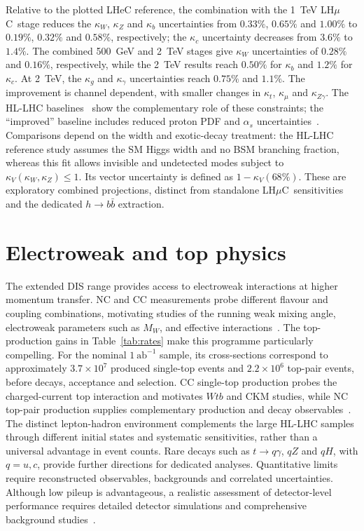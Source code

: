 \documentclass[a4paper,11pt]{article}
\newcommand{\lhmuc}{LH$\mu$C}
\begin{document}
Relative to the plotted LHeC reference, the combination with 
the 1~TeV \lhmuc\ stage reduces the $\kappa_W$, $\kappa_Z$ and $\kappa_b$ uncertainties 
from $0.33\%$, $0.65\%$ and $1.00\%$ to $0.19\%$, $0.32\%$ and $0.58\%$, respectively; 
the $\kappa_c$ uncertainty decreases from $3.6\%$ to $1.4\%$. 
The combined 500~GeV and 2~TeV stages give $\kappa_W$ uncertainties of $0.28\%$ and $0.16\%$, 
respectively, while the 2~TeV results reach $0.50\%$ for $\kappa_b$ and $1.2\%$ for $\kappa_c$. 
At 2~TeV, the $\kappa_g$ and $\kappa_\gamma$ uncertainties reach $0.75\%$ and $1.1\%$. 
The improvement is channel dependent, with smaller changes in $\kappa_t$, $\kappa_\mu$ and $\kappa_{Z\gamma}$. 
The HL-LHC baselines~\cite{ATLAS:2025eii} show the complementary role of these constraints; 
the ``improved'' baseline includes reduced proton PDF and $\alpha_s$ uncertainties~\cite{Ahmadova:2025vzd}. 
Comparisons depend on the width and exotic-decay treatment: the HL-LHC reference study 
assumes the SM Higgs width and no BSM branching fraction, whereas this fit allows 
invisible and undetected modes subject to $\kappa_V(\kappa_W,\kappa_Z)\le1$. 
Its vector uncertainty is defined as $1-\kappa_V(68\%)$. These are exploratory combined 
projections, distinct from standalone \lhmuc\ sensitivities and the dedicated $h\to b\bar b$ extraction.




\section{Electroweak and top physics}\label{sec:ewtop}

The extended DIS range provides access to electroweak interactions at higher momentum transfer. 
NC and CC measurements probe different flavour and coupling combinations, 
motivating studies of the running weak mixing angle, electroweak parameters 
such as $M_W$, and effective interactions~\cite{HELP4CERN,LHeC:2020van}. 
The top-production gains in Table~\ref{tab:rates} make this programme particularly compelling. 
For the nominal $1~\mathrm{ab}^{-1}$ sample, its cross-sections correspond to 
approximately $3.7\times10^7$ produced single-top events and $2.2\times10^6$ top-pair events, 
before decays, acceptance and selection. CC single-top production probes the charged-current 
top interaction and motivates $Wtb$ and CKM studies, while NC top-pair production supplies 
complementary production and decay observables~\cite{HELP4CERN}. The distinct lepton-hadron environment 
complements the large HL-LHC samples through different initial states and 
systematic sensitivities, rather than a universal advantage in event counts. 
Rare decays such as $t\to q\gamma$, $qZ$ and $qH$, with $q=u,c$, provide further 
directions for dedicated analyses. Quantitative limits require reconstructed observables, 
backgrounds and correlated uncertainties. 
Although low pileup is advantageous, a realistic assessment of
detector-level performance requires detailed detector simulations
and comprehensive background studies~\cite{HELP4CERN}. 
\end{document}
